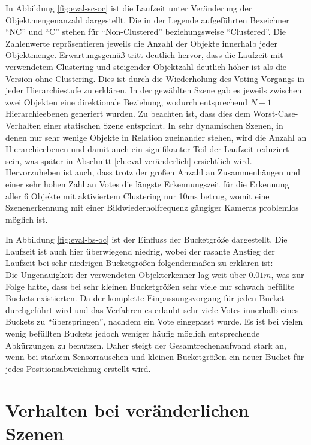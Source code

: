 In Abbildung \vref{fig:eval-sc-oc} ist die Laufzeit unter Veränderung der Objektmengenanzahl dargestellt.
Die in der Legende aufgeführten Bezeichner "`NC"' und "`C"' stehen für "`Non-Clustered"' beziehungsweise "`Clustered"'.
Die Zahlenwerte repräsentieren jeweils die Anzahl der Objekte innerhalb jeder Objektmenge.
Erwartungsgemäß tritt deutlich hervor, dass die Laufzeit mit verwendetem Clustering und steigender Objektzahl deutlich höher ist als die Version ohne Clustering.
Dies ist durch die Wiederholung des Voting-Vorgangs in jeder Hierarchiestufe zu erklären.
In der gewählten Szene gab es jeweils zwischen zwei Objekten eine direktionale Beziehung, wodurch entsprechend $N-1$ Hierarchieebenen generiert wurden.
Zu beachten ist, dass dies dem Worst-Case-Verhalten einer statischen Szene entspricht.
In sehr dynamischen Szenen, in denen nur sehr wenige Objekte in Relation zueinander stehen, wird die Anzahl an Hierarchieebenen und damit auch ein signifikanter Teil der Laufzeit reduziert sein, was später in Abschnitt \vref{ch:eval-veränderlich} ersichtlich wird.
Hervorzuheben ist auch, dass trotz der großen Anzahl an Zusammenhängen und einer sehr hohen Zahl an Votes die längste Erkennungszeit für die Erkennung aller 6 Objekte mit aktiviertem Clustering nur 10ms betrug, womit eine Szenenerkennung mit einer Bildwiederholfrequenz gängiger Kameras problemlos möglich ist.

In Abbildung \vref{fig:eval-bs-oc} ist der Einfluss der Bucketgröße dargestellt.
Die Laufzeit ist auch hier überwiegend niedrig, wobei der rasante Anstieg der Laufzeit bei sehr niedrigen Bucketgrößen folgendermaßen zu erklären ist:\\
Die Ungenauigkeit der verwendeten Objekterkenner lag weit über $0.01m$, was zur Folge hatte, dass bei sehr kleinen Bucketgrößen sehr viele nur schwach befüllte Buckets existierten.
Da der komplette Einpassungsvorgang für jeden Bucket durchgeführt wird und das Verfahren es erlaubt sehr viele Votes innerhalb eines Buckets zu "`überspringen"', nachdem ein Vote eingepasst wurde.
Es ist bei vielen wenig befüllten Buckets jedoch weniger häufig möglich entsprechende Abkürzungen zu benutzen.
Daher steigt der Gesamtrechenaufwand stark an, wenn bei starkem Sensorrauschen und kleinen Bucketgrößen ein neuer Bucket für jedes Positionsabweichnug erstellt wird.

\section{Verhalten bei veränderlichen Szenen}\label{ch:eval-veränderlich}


